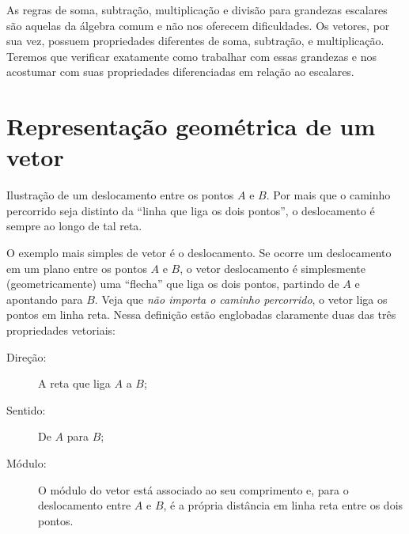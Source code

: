 As regras de soma, subtração, multiplicação e divisão para grandezas escalares são aquelas da álgebra comum e não nos oferecem dificuldades. Os vetores, por sua vez, possuem propriedades diferentes de soma, subtração, e multiplicação. Teremos que verificar exatamente como trabalhar com essas grandezas e nos acostumar com suas propriedades diferenciadas em relação ao escalares.


\section{Representação geométrica de um vetor}

\begin{marginfigure}
\centering
{}
\caption{Ilustração de um deslocamento entre os pontos $A$ e $B$. Por mais que o caminho percorrido seja distinto da ``linha que liga os dois pontos'', o deslocamento é sempre ao longo de tal reta.}
\end{marginfigure}

O exemplo mais simples de vetor é o deslocamento. Se ocorre um deslocamento em um plano entre os pontos $A$ e $B$, o vetor deslocamento é simplesmente (geometricamente) uma ``flecha'' que liga os dois pontos, partindo de $A$ e apontando para $B$. Veja que \emph{não importa o caminho percorrido}, o vetor liga os pontos em linha reta. Nessa definição estão englobadas claramente duas das três propriedades vetoriais:
\begin{description}
    \item[Direção:] A reta que liga $A$ a $B$;
    \item[Sentido:] De $A$ para $B$;
    \item[Módulo:] O módulo do vetor está associado ao seu comprimento e, para o deslocamento entre $A$ e $B$, é a própria distância em linha reta entre os dois pontos.
\end{description}

